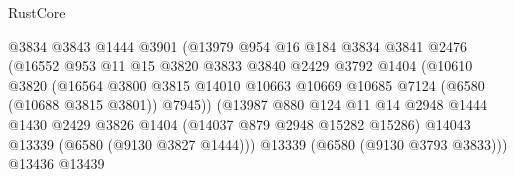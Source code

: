 \begin{lexlean}{RustCore}
\begin{coremodule}
                                      @3834
                                      @3843
                                      @1444
                                      @3901
                                      (@13979
                                        @954
                                        @16
                                        @184
                                        @3834
                                        @3841
                                        @2476
                                        (@16552
                                          @953
                                          @11
                                          @15
                                          @3820
                                          @3833
                                          @3840
                                          @2429
                                          @3792
                                          @1404
                                          (@10610
                                            @3820
                                            (@16564
                                              @3800
                                              @3815
                                              @14010
                                              @10663
                                              @10669
                                              @10685
                                              @7124
                                              (@6580 (@10688 @3815 @3801))
                                              @7945))
                                          (@13987
                                            @880
                                            @124
                                            @11
                                            @14
                                            @2948
                                            @1444
                                            @1430
                                            @2429
                                            @3826
                                            @1404
                                            (@14037 @879 @2948 @15282 @15286)
                                            @14043
                                            @13339
                                            (@6580 (@9130 @3827 @1444)))
                                          @13339
                                          (@6580 (@9130 @3793 @3833)))
                                        @13436
                                        @13439

\end{coremodule}
\end{lexlean}
